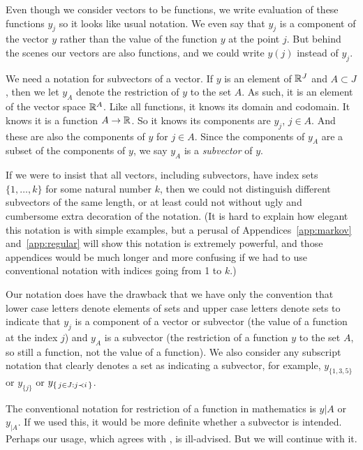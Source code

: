 Even though we consider vectors to be functions, we write evaluation
of these functions $y_j$ so it looks like usual notation.  We even say
that $y_j$ is a component of the vector $y$ rather than the value of
the function $y$ at the point $j$.  But behind the scenes our vectors
are also functions, and we could write $y(j)$ instead of $y_j$.

We need a notation for subvectors of a vector.  If $y$ is an element
of $\mathbb{R}^J$ and $A \subset J$, then we let $y_A$ denote the restriction
of $y$ to the set $A$.
As such, it is an element of the vector space $\mathbb{R}^A$.
Like all functions, it knows its domain and codomain.
It knows it is a function $A \to \mathbb{R}$.
So it knows its components are $y_j$, $j \in A$.
And these are also the components of $y$ for $j \in A$.
Since the components of $y_A$ are a subset of the components of $y$,
we say $y_A$ is a \emph{subvector} of $y$.

If we were to insist that all vectors, including subvectors, have
index sets $\{1, \ldots, k\}$ for some natural number $k$, then we could
not distinguish different subvectors of the same length, or at least could
not without ugly and cumbersome extra decoration of the notation.
(It is hard to explain how elegant this notation is with simple examples,
but a perusal of Appendices~\ref{app:markov} and~\ref{app:regular}
will show this notation is
extremely powerful, and those appendices would be much longer and more confusing
if we had to use conventional notation with indices going from 1 to $k$.)

Our notation does have the drawback that we have only the convention
that lower case letters denote elements of sets and upper case letters
denote sets to indicate that $y_j$ is a component of a vector or subvector
(the value of a function at the index $j$) and $y_A$ is a subvector
(the restriction of a function $y$ to the set $A$, so still a function,
not the value of a function).
We also consider any subscript notation that clearly denotes a set
as indicating a subvector, for example, $y_{\{1, 3, 5\}}$ or $y_{\{j\}}$ or
$y_{\{\,  j \in J : j \prec i  \,\}}$.

The conventional notation for restriction of a function in mathematics
is $y | A$ or $y_{| A}$.  If we used this, it would be more definite
whether a subvector is intended.  Perhaps our usage, which agrees
with \citeauthor{lauritzen}, is ill-advised.  But we will continue
with it.

